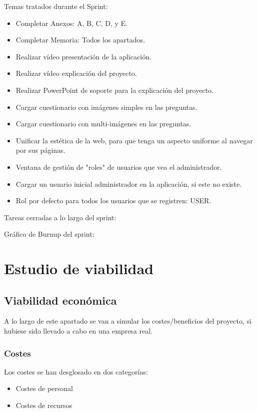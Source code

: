 Temas tratados durante el Sprint:
\begin{itemize}
	\item Completar Anexos: A, B, C, D, y E.
	\item Completar Memoria: Todos los apartados.
	\item Realizar vídeo presentación de la aplicación.
	\item Realizar vídeo explicación del proyecto.
	\item Realizar PowerPoint de soporte para la explicación del proyecto.
	\item Cargar cuestionario con imágenes simples en las preguntas.
	\item Cargar cuestionario con multi-imágenes en las preguntas.
	\item Unificar la estética de la web, para que tenga un aspecto uniforme al navegar por sus páginas.
	\item Ventana de gestión de "roles" de usuarios que vea el administrador.
	\item Cargar un usuario inicial administrador en la aplicación, si este no existe.
	\item Rol por defecto para todos los usuarios que se registren: USER.
\end{itemize}
\clearpage
Tareas cerradas a lo largo del sprint:

Gráfico de Burnup del sprint:
\clearpage
\section{Estudio de viabilidad}

\subsection{Viabilidad económica}

A lo largo de este apartado se van a simular los costes/beneficios del proyecto, si hubiese sido llevado a cabo en una empresa real.

\subsubsection{Costes}
Los costes se han desglosado en dos categorías:
\begin{itemize}
	\item	Costes de personal
	\item	Costes de recursos
\end{itemize}

